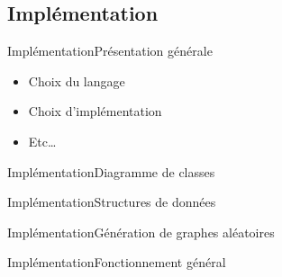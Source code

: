 \subsection{Implémentation}
\begin{frame}{Implémentation}{Présentation générale}
\begin{itemize}
\item Choix du langage
\item Choix d'implémentation
\item Etc\ldots
\end{itemize}
\end{frame}

\begin{frame}{Implémentation}{Diagramme de classes}
\end{frame}

\begin{frame}{Implémentation}{Structures de données}
\end{frame}

\begin{frame}{Implémentation}{Génération de graphes aléatoires}
\end{frame}

\begin{frame}{Implémentation}{Fonctionnement général}
\end{frame}